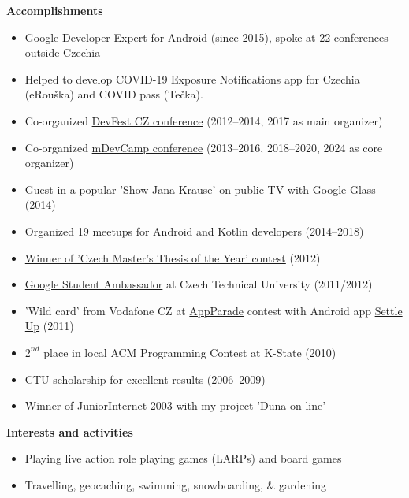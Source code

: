 \documentclass[letterpaper,11pt]{article}
\newcommand{\resheading}[1]{{\large \colorbox{mygrey}{\begin{minipage}{\textwidth}{\textbf{#1 \vphantom{p\^{E}}}}\end{minipage}}}}
\begin{document}
	
\resheading{Accomplishments}
\begin{itemize}
	\item
	\href{https://developers.google.com/experts/}{Google Developer Expert for Android} (since 2015), spoke at 22 conferences outside Czechia
	\item Helped to develop COVID-19 Exposure Notifications app for Czechia (eRouška) and COVID pass (Tečka).
	\item{Co-organized \href{http://www.devfest.cz/}{DevFest CZ conference} (2012--2014, 2017 as main organizer)}
	\item{Co-organized \href{http://www.mdevcamp.eu/}{mDevCamp conference} (2013--2016, 2018--2020, 2024 as core organizer)}
	\item
	\href{https://www.youtube.com/watch?v=6z3ScqblqFk}{Guest in a popular 'Show Jana Krause' on public TV with Google Glass} (2014)
	\item Organized 19 meetups for Android and Kotlin developers (2014--2018)
	\item \href{http://www.diplomovaprace.cz/}{Winner of 'Czech Master's Thesis of the Year' contest} (2012)
	\item  \href{http://www.google.com/intl/en/jobs/students/proscho/programs/emea/ambassador/}{Google Student Ambassador} at Czech Technical University (2011/2012)
	\item 'Wild card' from Vodafone CZ at \href{http://www.mediar.cz/treti-prehlidku-appparade-ovladly-aplikace-pro-android-zvitezil-night-walker-tomase-zveriny/}{AppParade} contest with Android app \href{https://market.android.com/details?id=cz.destil.settleup}{Settle Up} (2011)
	\item $2^{nd}$ place in local ACM Programming Contest at K-State (2010) 
	\item CTU scholarship for excellent results (2006--2009)
	\item \href{http://www.juniorinternet.cz/winners/307/david-vavra.aspx}{Winner of JuniorInternet 2003 with my project 'Duna on-line'}
\end{itemize}	


\resheading{Interests and activities}
\begin{itemize}
	\item Playing live action role playing games (LARPs) and board games
	\item  Travelling, geocaching, swimming, snowboarding, \& gardening
\end{itemize}
\end{document}
